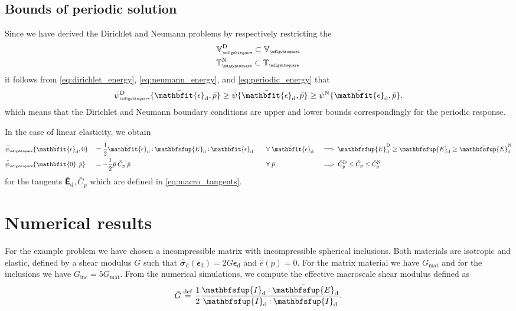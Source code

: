 \documentclass[12pt,a4paper]{article}
\renewcommand{\ts}[1]{\mathbfit{#1}}
\renewcommand{\tf}[1]{\mathbfsfup{#1}}
\renewcommand{\Box}{\mdlgwhtsquare}
\renewcommand{\dev}{\mathrm{d}}
\newcommand{\ded}{\mathrm{d}}
\newcommand{\dep}{\mathrm{p}}
\newcommand{\rve}{
  {\mathchoice
   {\mbox{\scalebox{0.67}{$\Box$}}}
   {\mbox{\scalebox{0.67}{$\Box$}}}
   {\mbox{\scalebox{0.5}{$\Box$}}}
   {\mbox{\scalebox{0.375}{$\Box$}}}
  }
}
\begin{document}
\subsection{Bounds of periodic solution}

Since we have derived the Dirichlet and Neumann problems by respectively restricting the 
\begin{align}
 &\set{V}_\rve^\Dirichlet \subset \set{V}_\rve\\
 &\set{T}_\rve^\Neumann \subset \set{T}_\rve
\end{align}
it follows from \cref{eq:dirichlet_energy}, \cref{eq:neumann_energy}, and \cref{eq:periodic_energy} that
\begin{align}
 \bar\psi^\Dirichlet_\rve\{\bar{\ts\epsilon}_\dev, \bar{p}\} \geq \bar\psi\{\bar{\ts\epsilon}_\dev, \bar {p}\} \geq \bar\psi^\Neumann\{\bar{\ts\epsilon}_\dev, \bar {p}\}.
\end{align}
which means that the Dirichlet and Neumann boundary conditions are upper and lower bounds correspondingly for the periodic response.

In the case of linear elasticity, we obtain
\begin{alignat}{4}
 &\bar{\psi}_\rve\{\bar{\ts\epsilon}_\dev, 0\} &&= \frac12 \bar{\ts\epsilon}_\dev \dprod \bar{\tf E}_{\ded}\dprod \bar{\ts\epsilon}_\dev %
&\quad&\forall\;\bar{\ts\epsilon}_\dev &&\implies
 \bar{\tf E}_{\ded}^\Dirichlet \geq \bar{\tf E}_{\ded} \geq \bar{\tf E}_{\ded}^\Neumann
\\
 &\bar{\psi}_\rve\{\ts 0, \bar{p}\} &&= -\frac12 \bar{p}\;\bar{C}_{\dep}\;\bar{p} %
&\quad&\forall\;\bar{p} &&\implies
 \bar{C}_\dep^\Dirichlet \leq \bar{C}_\dep \leq \bar{C}_\dep^\Neumann
\end{alignat}
for the tangents $\bar{\tf E}_\ded, \bar{C}_\dep$ which are defined in \cref{eq:macro_tangents}.



\section{Numerical results}
For the example problem we have chosen a incompressible matrix with incompressible spherical inclusions.
Both materials are isotropic and elastic, defined  by a shear modulus $G$ such that $\hat{\ts\sigma}_\dev(\ts\epsilon_\dev) = 2 G \ts\epsilon_\dev$ and $\hat{e}(p) = 0$.
For the matrix material we have $G_\mathrm{mat}$ and for the inclusions we have $G_\mathrm{inc} = 5 G_\mathrm{mat}$.
From the numerical simulations, we compute the effective macroscale shear modulus defined as
\begin{align}
 \bar{G} \defeq \frac12 \frac{\tf I_\dev \dprod \bar{\tf E}_\dev}{\tf I_\dev \dprod \tf I_\dev}.
\end{align}
\end{document}
